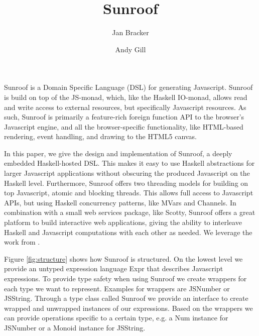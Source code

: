 \documentclass{llncs}
\newcommand{\Src}[1]{{\sf #1}}
\begin{document}
%
\title{Sunroof}
%
%
\author{Jan Bracker \and Andy Gill}
%
%
%

\maketitle              %

Sunroof is a Domain Specific Language (DSL) for generating Javascript.
Sunroof is build on top of the JS-monad, which, like the Haskell IO-monad, allows 
read and write access to external resources, but specifically Javascript
resources. As such, Sunroof is primarily a feature-rich foreign
function API to the browser's Javascript engine, and all the browser-specific
functionality, like HTML-based rendering, event handling, and 
drawing to the HTML5 canvas. 

In this paper, we give the design and implementation of Sunroof, a 
deeply embedded Haskell-hosted DSL.
This makes it easy to use Haskell abstractions for larger Javascript
applications without obscuring the produced Javascript on the Haskell
level. 
Furthermore, Sunroof offers two threading models for 
building on top Javascript, atomic and blocking threads.
This allows full access to Javascript APIs, but
using Haskell concurrency patterns, like MVars and Channels.
In combination with a small web services package, like Scotty,
Sunroof offers a great platform to build interactive web applications,
giving the ability to interleave Haskell and Javascript computations
with each other as needed. 
We leverage the work from \cite{Farmer:12:WebDSLs}.

Figure \ref{fig:structure} shows how Sunroof is structured.
On the lowest level we provide an untyped expression language \Src{Expr}
that describes Javascript expressions. 
To provide type safety when using Sunroof we create wrappers for each 
type we want to represent. Examples for wrappers are \Src{JSNumber}
or \Src{JSString}. Through a type class
called \Src{Sunroof} we provide an interface to create wrapped and unwrapped
instances of our expressions. Based on the wrappers we can provide 
operations specific to a certain type, e.g. a \Src{Num} instance
for \Src{JSNumber} or a \Src{Monoid} instance for \Src{JSString}.
\end{document}
